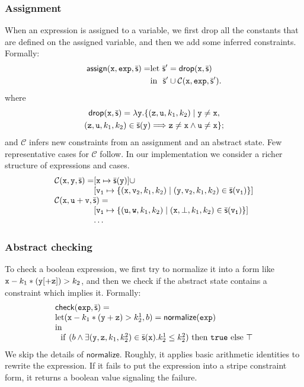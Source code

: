 \documentclass[10pt]{sigplanconf}
\begin{document}
\subsubsection*{Assignment}
When an expression is assigned to a variable, we first drop all the constants that are defined on the assigned variable, and then we add some inferred constraints.
Formally: 
\[
\begin{split}
\mathsf{assign}(\mathtt{x}, \mathtt{exp}, \bar{\mathsf{s}})= & \mathrm{let\ } \bar{\mathsf{s}}' =  \mathsf{drop}(\mathtt{x},\bar{\mathsf{s}}) \\
  & \mathrm{in\ \ } \bar{\mathsf{s}}' \cup \mathcal{C}(\mathtt{x},\mathtt{exp}, \bar{\mathsf{s}}').
\end{split}
\]
where
\begin{multline*}
\mathsf{drop}(\mathtt{x},\bar{\mathsf{s}})=\lambda \mathtt{y}. \{(\mathtt{z}, \mathtt{u}, k_1, k_2) \mid   \mathtt{y} \neq \mathtt{x}, \\
(\mathtt{z}, \mathtt{u}, k_1, k_2) \in {\ensuremath{\bar{\mathsf{s}}}}(\mathtt{y})\Longrightarrow \mathtt{z}\neq \mathtt{x} \land\mathtt{u} \neq \mathtt{x}\};
\end{multline*}
and $\mathcal{C}$ infers new constraints from an assignment and an abstract state. 
Few  representative cases for $\mathcal{C}$ follow.
In our implementation we consider a richer structure of expressions and cases.
\[
\begin{array}{l@{}l}
  \mathcal{C}(\code{x}, \code{y}, \ael{s})=& \funzioneDue{\var{x}}{ \ael{s}(\code{y})} \cup \\ 
   & [\var{v_1} \mapsto \{(\var{x}, \var{v_2}, \const{k_1}, \const{k_2}) \mid (\var{y}, \var{v_2}, \const{k_1}, \const{k_2}) \in \abstrs{s}(\var{v_1})\}] \\
\multicolumn{2}{l}{\mathcal{C}(\code{x}, \code{u + v}, \ael{s})=}
\\
&[\var{v_1} \mapsto \{(\var{u}, \var{w}, \const{k_1}, \const{k_2}) \mid (\var{x}, \bot, \const{k_1}, \const{k_2}) \in \adom{s}(\var{v_1})\}] \\
& \dots 
\end{array}
\]

\subsubsection*{Abstract checking}
To check a boolean expression, we first try to normalize it into a form like $\mathtt{x}-k_1*(\mathtt{y}[+\mathtt{z}])>k_2$, and then we check if the abstract state contains a constraint which implies it.
Formally:
\[
\begin{array}{l}
\mathsf{check} (\expr{exp}, \abstrs{s})=
\\
\mathrm{let} (\var{x}-\const{k_1}*(\var{y}+\var{z})>\const{k^1_2}, b) = \normalize{\expr{exp}} \\
\mathrm{in}
\\
\mathrm{\ \ if\ }(b \land  \exists (\var{y},\var{z},\const{k_1},\const{k^2_2}) \in \abstrs{s}(\var{x}). \const{k^1_2} \leq \const{k^2_2})\ \mathrm{then\ }  \true\ \mathrm{else\ } \top
\end{array}
\]
We skip the details of $\mathsf{normalize}$. 
Roughly, it applies basic arithmetic identities to rewrite the expression.
If it fails to put the expression into a stripe constraint form, it returns a boolean value signaling the failure.
\end{document}
